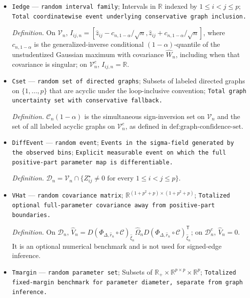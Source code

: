 \documentclass{article}
\begin{document}
\begin{itemize}
  \item \texttt{Iedge} --- \texttt{random interval family}; Intervals in \(\mathbb R\) indexed by \(1\leq i<j\leq p\); \texttt{Total coordinatewise event underlying conservative graph inclusion.}
  \par\smallskip\noindent\emph{Definition.} On \(\mathcal V_n\), \(I_{ij,n}=[\widehat z_{ij}-c_{n,1-\alpha}/\sqrt n,\widehat z_{ij}+c_{n,1-\alpha}/\sqrt n]\), where \(c_{n,1-\alpha}\) is the generalized-inverse conditional \((1-\alpha)\)-quantile of the unstudentized Gaussian maximum with covariance \(\widehat W_n\), including when that covariance is singular; on \(\mathcal V_n^c\), \(I_{ij,n}=\mathbb R\).
  \item \texttt{Cset} --- \texttt{random set of directed graphs}; Subsets of labeled directed graphs on \(\{1,\ldots,p\}\) that are acyclic under the loop-inclusive convention; \texttt{Total graph uncertainty set with conservative fallback.}
  \par\smallskip\noindent\emph{Definition.} \(\mathcal C_n(1-\alpha)\) is the simultaneous sign-inversion set on \(\mathcal V_n\) and the set of all labeled acyclic graphs on \(\mathcal V_n^c\), as defined in \(\text{def:graph-confidence-set}\).
  \item \texttt{DiffEvent} --- \texttt{random event}; \texttt{Events in the sigma-\allowbreak{}field generated by the observed bins}; \texttt{Explicit measurable event on which the full positive-\allowbreak{}part parameter map is differentiable.}
  \par\smallskip\noindent\emph{Definition.} \(\mathcal D_n=\mathcal V_n\cap\{Z_{ij}^\star\neq0\text{ for every }1\leq i<j\leq p\}\).
  \item \texttt{VHat} --- \texttt{random covariance matrix}; \(\mathbb R^{(1+p^2+p)\times(1+p^2+p)}\); \texttt{Totalized optional full-\allowbreak{}parameter covariance away from positive-\allowbreak{}part boundaries.}
  \par\smallskip\noindent\emph{Definition.} On \(\mathcal D_n\), \(\widehat V_n=D(\Phi_{\Delta,\widehat r_n}\circ\mathcal C)_{\widehat\xi_n}\widehat\Omega_nD(\Phi_{\Delta,\widehat r_n}\circ\mathcal C)_{\widehat\xi_n}^{\mathsf T}\); on \(\mathcal D_n^c\), \(\widehat V_n=0\). It is an optional numerical benchmark and is not used for signed-edge inference.
  \item \texttt{Tmargin} --- \texttt{random parameter set}; Subsets of \(\mathbb R_{+}\times\mathbb R^{p\times p}\times\mathbb R^p\); \texttt{Totalized fixed-\allowbreak{}margin benchmark for parameter diameter,\allowbreak{} separate from graph inference.}

\end{itemize}
\end{document}

